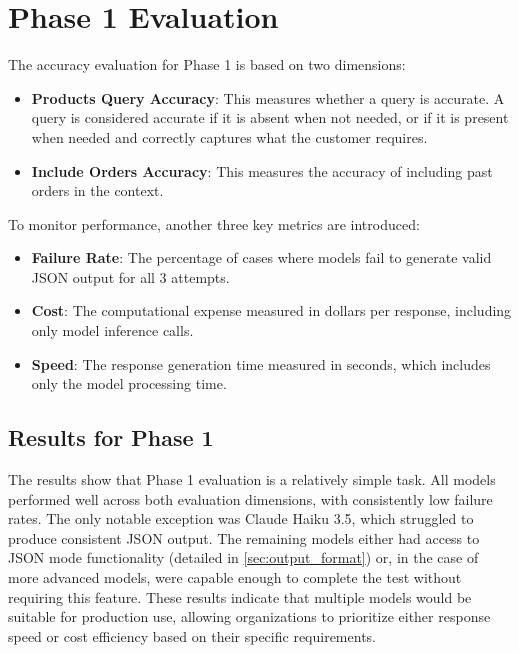 \section{Phase 1 Evaluation}

The accuracy evaluation for Phase 1 is based on two dimensions:
\begin{itemize}
    \item \textbf{Products Query Accuracy}: This measures whether a query is accurate. A query is considered accurate if it is absent when not needed, or if it is present when needed and correctly captures what the customer requires.
    \item \textbf{Include Orders Accuracy}: This measures the accuracy of including past orders in the context.
\end{itemize}
To monitor performance, another three key metrics are introduced:
\begin{itemize}
    \item \textbf{Failure Rate}: The percentage of cases where models fail to generate valid JSON output for all 3 attempts.
    \item \textbf{Cost}: The computational expense measured in dollars per response, including only model inference calls.
    \item \textbf{Speed}: The response generation time measured in seconds, which includes only the model processing time.
\end{itemize}

\subsection{Results for Phase 1}

The results show that Phase 1 evaluation is a relatively simple task.
All models performed well across both evaluation dimensions, with consistently low failure rates.
The only notable exception was Claude Haiku 3.5, which struggled to produce consistent JSON output.
The remaining models either had access to JSON mode functionality (detailed in \cref{sec:output_format}) or, in the case of more advanced models, were capable enough to complete the test without requiring this feature.
These results indicate that multiple models would be suitable for production use, allowing organizations to prioritize either response speed or cost efficiency based on their specific requirements.

